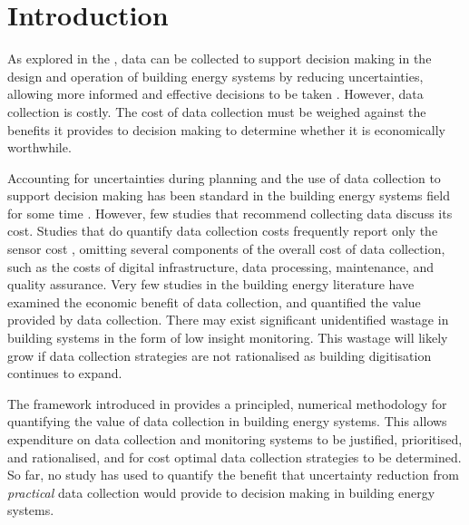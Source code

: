 \section{Introduction}

As explored in the , data can be collected to support decision making in the design and operation of building energy systems by reducing uncertainties, allowing more informed and effective decisions to be taken \citep{molina-solana2017DataScienceBuilding}.
However, data collection is costly.
The cost of data collection must be weighed against the benefits it provides to decision making to determine whether it is economically worthwhile.

Accounting for uncertainties during planning and the use of data collection to support decision making has been standard in the building energy systems field for some time \citep{tian2018ReviewUncertaintyAnalysis,rysanek2013OptimumBuildingEnergy,mavromatidis2018ReviewUncertaintyCharacterisation,mobaraki2022NovelDataAcquisition}.
However, few studies that recommend collecting data discuss its cost. Studies that do quantify data collection costs frequently report only the sensor cost \citep{han2020EnergysavingBuildingSystem,zhai2020AssessingImplicationsSubmetering}, omitting several components of the overall cost of data collection, such as the costs of digital infrastructure, data processing, maintenance, and quality assurance.
Very few studies in the building energy literature have examined the economic benefit of data collection, and quantified the value provided by data collection.
There may exist significant unidentified wastage in building systems in the form of low insight monitoring. This wastage will likely grow if data collection strategies are not rationalised as building digitisation continues to expand.

\newpage
The  framework introduced in  provides a principled, numerical methodology for quantifying the value of data collection in building energy systems. This allows expenditure on data collection and monitoring systems to be justified, prioritised, and rationalised, and for cost optimal data collection strategies to be determined. So far, no study has used  to quantify the benefit that uncertainty reduction from \textit{practical} data collection would provide to decision making in building energy systems.\\

